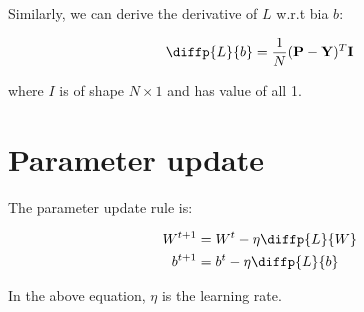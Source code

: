 \documentclass[a4paper, 12pt]{article}
\begin{document}
Similarly, we can derive the derivative of $L$ w.r.t bia $b$:

\begin{equation}\label{eq-deriv-L-to_b-matrix}
    \diffp{L}{b} = \frac{1}{N} (\mathbf{P} - \mathbf{Y})^T \mathbf{I}
\end{equation}

where $I$ is of shape $N\times 1$ and has value of all 1.

\section{Parameter update}

The parameter update rule is:

\begin{equation}\label{eq-param-update-rule}
    \begin{aligned}
        W^{t+1} &= W^{t} - \eta \diffp{L}{W} \\
        b^{t+1} &= b^{t} - \eta \diffp{L}{b}
    \end{aligned}
\end{equation}

In the above equation, $\eta$ is the learning rate.
\end{document}
